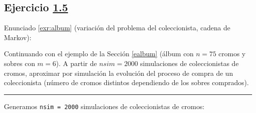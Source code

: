 \documentclass[
]{book}
\theoremstyle{break}
\theoremstyle{nonumberplain}
\begin{document}
\hypertarget{sol-album}{%
\subsection{\texorpdfstring{Ejercicio \href{ejercicios.html\#exr:album}{1.5}}{Ejercicio 1.5}}\label{sol-album}}

Enunciado \ref{exr:album} (variación del problema del coleccionista, cadena de Markov):

Continuando con el ejemplo de la Sección \ref{ealbum}
(álbum con \(n = 75\) cromos y sobres con \(m = 6\)). A partir de \(nsim=2000\) simulaciones de coleccionistas de cromos, aproximar por simulación la evolución del proceso de compra de un coleccionista (número de cromos distintos dependiendo de los sobres comprados).

\begin{center}\rule{0.5\linewidth}{0.5pt}\end{center}

Generamos \texttt{nsim\ =\ 2000} simulaciones de coleccionistas de cromos:
\end{document}
